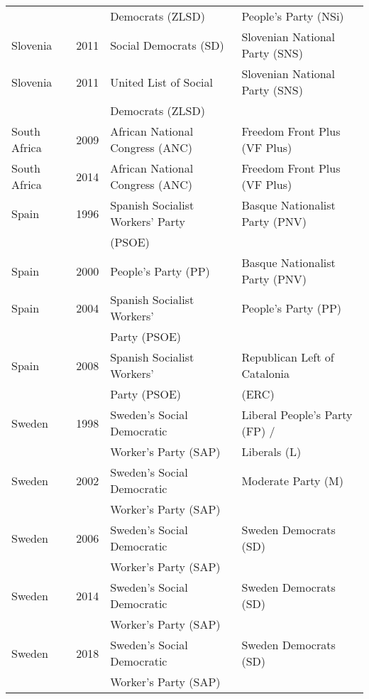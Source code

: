 {\begin{longtable}{|l|c|l|l|}
               &      &     Democrats (ZLSD)    &   People's Party (NSi)   \\ 
   Slovenia & 2011 &   Social Democrats (SD)  &   Slovenian National Party (SNS) \\ 
   Slovenia & 2011 &   United List of Social  &   Slovenian National Party (SNS) \\ 
               &      &     Democrats (ZLSD)    &     \\ 
   South Africa & 2009 &   African National Congress (ANC)   &   Freedom Front Plus (VF Plus) \\ 
   South Africa & 2014 &   African National Congress (ANC)   &   Freedom Front Plus (VF Plus) \\ 
   Spain & 1996 &   Spanish Socialist Workers' Party  &   Basque Nationalist Party (PNV)   \\ 
               &      &     (PSOE)  &     \\ 
   Spain & 2000 &   People's Party (PP) &   Basque Nationalist Party (PNV)   \\ 
   Spain & 2004 &   Spanish Socialist Workers' &   People's Party (PP) \\ 
               &      &     Party (PSOE)     &     \\ 
  Spain & 2008 &   Spanish Socialist Workers'  &   Republican Left of Catalonia  \\ 
               &      &       Party (PSOE)  &    (ERC) \\ 
   Sweden & 1998 &   Sweden's   Social Democratic &   Liberal People's Party (FP) /  \\ 
               &      &  Worker's Party (SAP)      &    Liberals (L)   \\ 
   Sweden & 2002 &   Sweden's   Social Democratic  &   Moderate Party (M) \\ 
               &      &      Worker's Party (SAP)  &     \\ 
   Sweden & 2006 &   Sweden's   Social Democratic  &   Sweden Democrats (SD) \\ 
               &      &   Worker's Party (SAP)     &     \\ 
   Sweden & 2014 &   Sweden's   Social Democratic  &   Sweden Democrats (SD) \\ 
               &      &   Worker's Party (SAP)     &     \\ 
   Sweden & 2018 &   Sweden's   Social Democratic  &   Sweden Democrats (SD) \\ 
               &      &     Worker's Party (SAP)   &     \\ 

\end{longtable}}

